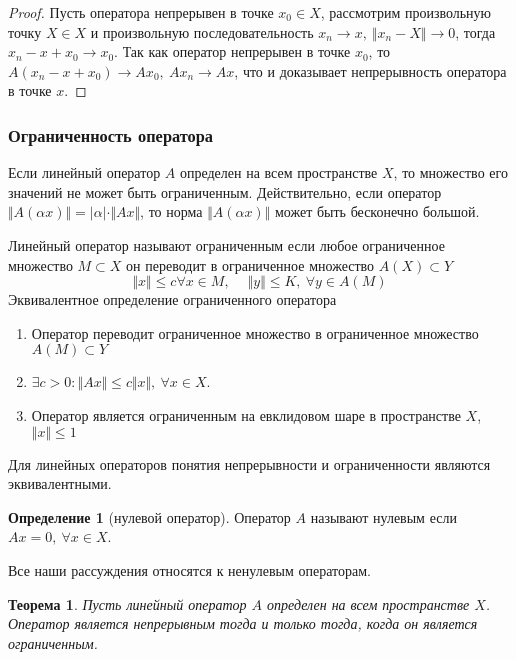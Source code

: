 \documentclass[14pt,a4paper]{extarticle}
\newtheorem{theorem}{Теорема}[section]
\theoremstyle{definition}
\newtheorem{definition}{Определение}[section]
\theoremstyle{remark}
\renewcommand{\[}{\begin{dmath*}[compact]}
\renewcommand{\]}{\end{dmath*}}
\newcommand{\be}{\begin{enumerate}}
\newcommand{\ee}{\end{enumerate}}
\newcommand{\sep}{ , \ \allowbreak }
\begin{document}
\begin{proof}
  Пусть оператора непрерывен в точке $x_0 \in X$, рассмотрим произвольную точку
  $X \in X$ и произвольную последовательность
  $x_n \to x \sep \Vert x_n - X \Vert \to 0$, тогда $x_n - x + x_0 \to x_0$.
  Так как оператор непрерывен в точке $x_0$,
  то $A(x_n-x+x_0) \to Ax_0 \sep Ax_n \to Ax$,
  что и доказывает непрерывность оператора в точке $x$.
\end{proof}

\subsubsection{Ограниченность оператора}

Если линейный оператор $A$ определен на всем пространстве $X$,
то множество его значений не может быть ограниченным.
Действительно, если оператор
$\Vert A (\alpha x) \Vert = |\alpha| \cdot \Vert Ax \Vert$,
то норма $\Vert A (\alpha x) \Vert$ может быть бесконечно большой.

Линейный оператор называют ограниченным если любое ограниченное множество
$M \subset X$ он переводит в ограниченное множество $A (X) \subset Y$
\[\Vert x \Vert \leq c \forall x \in M \sep \quad
\Vert y \Vert \leq K \sep \forall y \in A (M)\]
Эквивалентное определение ограниченного оператора

\be
  \item Оператор переводит ограниченное множество в ограниченное множество
  $A(M) \subset Y$

  \item $\exists c > 0: \Vert Ax \Vert \leq c \Vert x \Vert \sep
  \forall x \in X$.

  \item Оператор является ограниченным на евклидовом шаре в пространстве $X$,
  $\Vert x \Vert \leq 1$
\ee

Для линейных операторов понятия непрерывности и ограниченности являются
эквивалентными.

\begin{definition}[нулевой оператор]
  Оператор $A$ называют нулевым если $Ax=0 \sep \forall x \in X$.
\end{definition}

Все наши рассуждения относятся к ненулевым операторам.

\begin{theorem}
  Пусть линейный оператор $A$ определен на всем пространстве $X$.
  Оператор является непрерывным тогда и только тогда, когда он является
  ограниченным.
\end{theorem}
\end{document}
